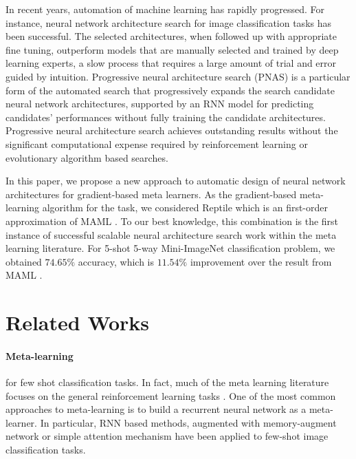 \documentclass{article}
\begin{document}
In recent years, automation of machine learning has rapidly progressed. For instance, neural network architecture search
for image classification tasks has been successful. The selected architectures, when followed up with appropriate fine tuning, outperform models that are manually selected and trained by deep learning experts, a slow process that requires a large amount of trial and error guided by intuition.
Progressive neural architecture  search (PNAS) \cite{liu:pnas_google:DBLP:journals/corr/abs-1712-00559} 
is a particular form of the automated search that progressively expands the search candidate neural network architectures, supported by an RNN model for predicting candidates' performances without fully training the candidate architectures. Progressive neural architecture search achieves outstanding results without the significant computational expense required by reinforcement learning or evolutionary algorithm based searches.

In this paper, we propose a new approach to automatic design of neural network architectures for gradient-based meta learners. 
As the gradient-based meta-learning algorithm for the task, we considered Reptile \cite{nichol:reptile:DBLP:journals/corr/abs-1803-02999} which is an first-order approximation of MAML \cite{finn:maml:DBLP:conf/icml/FinnAL17}. To our best knowledge, this combination is the first instance of successful
scalable neural architecture search work within the meta learning literature. For 5-shot 5-way Mini-ImageNet classification problem, we obtained $74.65\%$ accuracy, which is $11.54\%$ improvement over the result from MAML \cite{finn:maml:DBLP:conf/icml/FinnAL17}.


\section{Related Works}\paragraph{Meta-learning}%
for few shot classification tasks. In fact, much of the meta learning literature focuses on the general reinforcement
learning tasks \cite{DBLP:journals/corr/DuanSCBSA16:fast_rl, DBLP:journals/corr/WangKTSLMBKB16:learn_to_rl}.
One of the most common approaches to meta-learning is to build a recurrent neural network as a meta-learner. 
In particular, RNN based methods, augmented with
memory-augment network \cite{santoro:memoty_meta:DBLP:conf/icml/SantoroBBWL16} or simple attention mechanism \cite{mishra:attentive_meta:DBLP:journals/corr/MishraRCA17} have been
applied to few-shot image classification tasks. 
\end{document}
